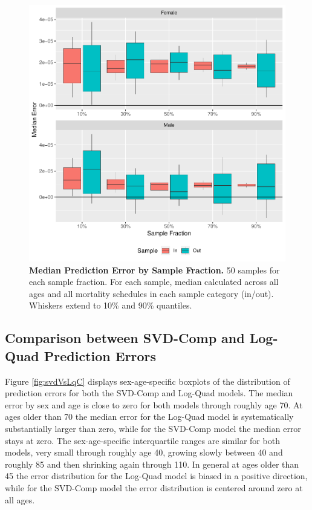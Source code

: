\documentclass[11pt]{article}
\begin{document}
\begin{figure}[htbp]
   \centering
   \includegraphics[width=\linewidth]{../figures/fig5a.pdf} 
   \captionsetup{format=plain,font=normalsize,margin=0cm,justification=justified}
   \caption{\textbf{Median Prediction Error by Sample Fraction.}  50 samples for each sample fraction.  For each sample, median calculated across all ages and all mortality schedules in each sample category (in/out). Whiskers extend to 10\% and 90\% quantiles.}
   \label{fig:medSampErr}
\end{figure}

\subsection{Comparison between SVD-Comp and Log-Quad Prediction Errors}

Figure \ref{fig:svdVsLqC} displays sex-age-specific boxplots of the distribution of prediction errors for both the SVD-Comp and Log-Quad models.  The median error by sex and age is close to zero for both models through roughly age 70.  At ages older than 70 the median error for the Log-Quad model is systematically substantially larger than zero, while for the SVD-Comp model the median error stays at zero.  The sex-age-specific interquartile ranges are similar for both models, very small through roughly age 40, growing slowly between 40 and roughly 85 and then shrinking again through 110. In general at ages older than 45 the error distribution for the Log-Quad model is biased in a positive direction, while for the SVD-Comp model the error distribution is centered around zero at all ages.
\end{document}
